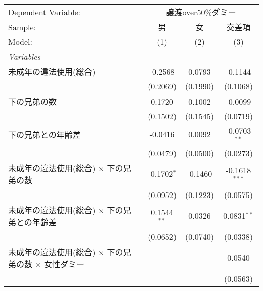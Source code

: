 \documentclass{article}
\begin{document}
\begin{landscape}


\begingroup
\centering
\begin{threeparttable}[b]
   \begin{tabular}{lccc}
      \tabularnewline \midrule \midrule
      Dependent Variable: & \multicolumn{3}{c}{譲渡over50\%ダミー}\\
      Sample:                                                            & 男            & 女       & 交差項 \\   
      Model:                                                             & (1)           & (2)      & (3)\\  
      \midrule
      \emph{Variables}\\
      未成年の違法使用(総合)                                             & -0.2568       & 0.0793   & -0.1144\\   
                                                                         & (0.2069)      & (0.1990) & (0.1068)\\   
      下の兄弟の数                                                       & 0.1720        & 0.1002   & -0.0099\\   
                                                                         & (0.1502)      & (0.1545) & (0.0719)\\   
      下の兄弟との年齢差                                                 & -0.0416       & 0.0092   & -0.0703$^{**}$\\   
                                                                         & (0.0479)      & (0.0500) & (0.0273)\\   
      未成年の違法使用(総合) $\times$ 下の兄弟の数                       & -0.1702$^{*}$ & -0.1460  & -0.1618$^{***}$\\   
                                                                         & (0.0952)      & (0.1223) & (0.0575)\\   
      未成年の違法使用(総合) $\times$ 下の兄弟との年齢差                 & 0.1544$^{**}$ & 0.0326   & 0.0831$^{**}$\\   
                                                                         & (0.0652)      & (0.0740) & (0.0338)\\   
      未成年の違法使用(総合) $\times$ 下の兄弟の数 $\times$ 女性ダミー   &               &          & 0.0540\\   
                                                                         &               &          & (0.0563)\\   

\end{tabular}
\end{threeparttable}
\end{landscape}
\end{document}
